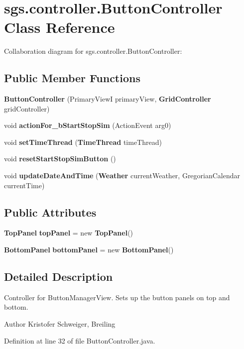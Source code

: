 \section{sgs.\-controller.\-Button\-Controller Class Reference}
\label{classsgs_1_1controller_1_1_button_controller}


Collaboration diagram for sgs.\-controller.\-Button\-Controller\-:
\subsection*{Public Member Functions}
\begin{DoxyCompactItemize}
\item 
{\bf Button\-Controller} (Primary\-View\-I primary\-View, {\bf Grid\-Controller} grid\-Controller)
\item 
void {\bf action\-For\-\_\-b\-Start\-Stop\-Sim} (Action\-Event arg0)
\item 
void {\bf set\-Time\-Thread} ({\bf Time\-Thread} time\-Thread)
\item 
void {\bf reset\-Start\-Stop\-Sim\-Button} ()
\item 
void {\bf update\-Date\-And\-Time} ({\bf Weather} current\-Weather, Gregorian\-Calendar current\-Time)
\end{DoxyCompactItemize}
\subsection*{Public Attributes}
\begin{DoxyCompactItemize}
\item 
{\bf Top\-Panel} {\bf top\-Panel} = new {\bf Top\-Panel}()
\item 
{\bf Bottom\-Panel} {\bf bottom\-Panel} = new {\bf Bottom\-Panel}()
\end{DoxyCompactItemize}


\subsection{Detailed Description}
Controller for Button\-Manager\-View. Sets up the button panels on top and bottom. \begin{DoxyAuthor}{Author}
Kristofer Schweiger, Breiling 
\end{DoxyAuthor}


Definition at line 32 of file Button\-Controller.\-java.



